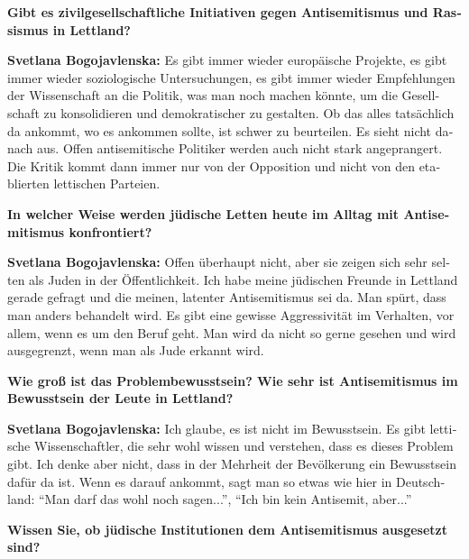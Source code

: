 \begin{otherlanguage}{ngerman}
\textbf{Gibt es zivilgesellschaftliche Initiativen gegen Antisemitismus und Rassismus in Lettland?}

\textbf{Svetlana Bogojavlenska:} Es gibt immer wieder europäische Projekte, es gibt immer wieder soziologische Untersuchungen, es gibt immer wieder Empfehlungen der Wissenschaft an die Politik, was man noch machen könnte, um die Gesellschaft zu konsolidieren und demokratischer zu gestalten. Ob das alles tatsächlich da ankommt, wo es ankommen sollte, ist schwer zu beurteilen. Es sieht nicht danach aus. Offen antisemitische Politiker werden auch nicht stark angeprangert. Die Kritik kommt dann immer nur von der Opposition und nicht von den etablierten lettischen Parteien.

\textbf{In welcher Weise werden jüdische Letten heute im Alltag mit Antisemitismus konfrontiert?}

\textbf{Svetlana Bogojavlenska:} Offen überhaupt nicht, aber sie zeigen sich sehr selten als Juden in der Öffentlichkeit. Ich habe meine jüdischen Freunde in Lettland gerade gefragt und die meinen, latenter Antisemitismus sei da. Man spürt, dass man anders behandelt wird. Es gibt eine gewisse Aggressivität im Verhalten, vor allem, wenn es um den Beruf geht. Man wird da nicht so gerne gesehen und wird ausgegrenzt, wenn man als Jude erkannt wird. 

\textbf{Wie groß ist das Problembewusstsein? Wie sehr ist Antisemitismus im Bewusstsein der Leute in Lettland?}

\textbf{Svetlana Bogojavlenska:} Ich glaube, es ist nicht im Bewusstsein. Es gibt lettische Wissenschaftler, die sehr wohl wissen und verstehen, dass es dieses Problem gibt. Ich denke aber nicht, dass in der Mehrheit der Bevölkerung ein Bewusstsein dafür da ist. Wenn es darauf ankommt, sagt man so etwas wie hier in Deutschland: "`Man darf das wohl noch sagen..."', "`Ich bin kein Antisemit, aber..."' 

\textbf{Wissen Sie, ob jüdische Institutionen dem Antisemitismus ausgesetzt sind?}


\end{otherlanguage}
